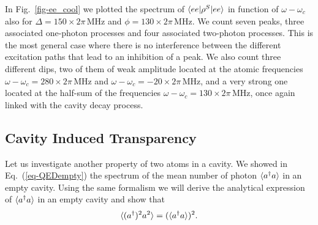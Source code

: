 In Fig.~\ref{fig-ee_cool} we plotted the spectrum of $\langle ee | \rho^S | ee \rangle$ in function of $\omega-\omega_c$ also for $\Delta=150\times 2\pi\,\mbox{MHz}$ and $\phi = 130\times 2\pi\,\mbox{MHz}$. We count seven peaks, three associated one-photon processes and four associated two-photon processes. This is the most general case where there is no interference between the different excitation paths that lead to an inhibition of a peak. We also count three different dips, two of them of weak amplitude located at the atomic frequencies $\omega-\omega_c=280\times 2\pi\,\mbox{MHz}$ and $\omega-\omega_c=-20\times 2\pi\,\mbox{MHz}$, and a very strong one located at the half-sum of the frequencies $\omega - \omega_c = 130\times 2\pi\,\mbox{MHz}$, once again linked with the cavity decay process.

\subsection{Cavity Induced Transparency}

Let us investigate another property of two atoms in a cavity. We showed in Eq.~(\ref{eq-QEDempty}) the spectrum of the mean number of photon $\langle a^\dagger a \rangle$ in an empty cavity. Using the same formalism we will derive the analytical expression of $\langle a^\dagger a \rangle$ in an empty cavity and show that
\[\langle (a^\dagger)^2 a^2 \rangle=(\langle a^\dagger a \rangle)^2.\]

